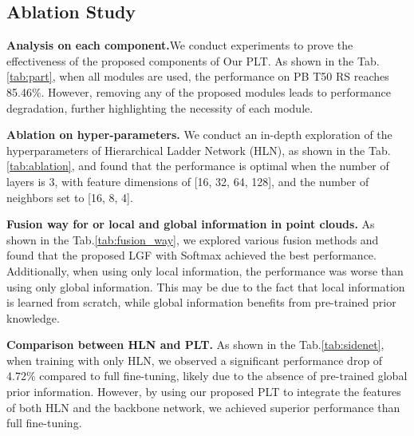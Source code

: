 











\subsection{Ablation Study}

\textbf{Analysis on each component.}We conduct experiments to prove the effectiveness of the proposed components of Our PLT. As shown in the Tab.\ref{tab:part}, when all modules are used, the performance on PB T50 RS reaches 85.46\%. However, removing any of the proposed modules leads to performance degradation, further highlighting the necessity of each module.

\textbf{Ablation on hyper-parameters.} We conduct an in-depth exploration of the hyperparameters of Hierarchical Ladder Network (HLN), as shown in the Tab.\ref{tab:ablation}, and found that the performance is optimal when the number of layers is 3, with feature dimensions of [16, 32, 64, 128], and the number of neighbors set to [16, 8, 4].

\textbf{Fusion way for or local and global information in point clouds.} As shown in the Tab.\ref{tab:fusion_way}, we explored various fusion methods and found that the proposed LGF with Softmax achieved the best performance. Additionally, when using only local information, the performance was worse than using only global information. This may be due to the fact that local information is learned from scratch, while global information benefits from pre-trained prior knowledge.

\textbf{Comparison between HLN and PLT.} As shown in the Tab.\ref{tab:sidenet}, when training with only HLN, we observed a significant performance drop of 4.72\% compared to full fine-tuning, likely due to the absence of pre-trained global prior information. However, by using our proposed PLT to integrate the features of both HLN and the backbone network, we achieved superior performance than full fine-tuning.

